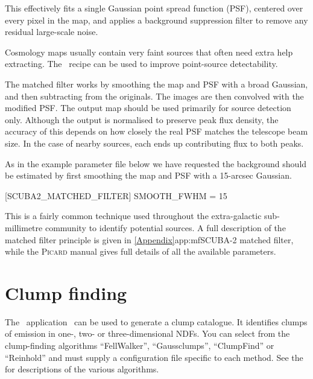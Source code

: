 This effectively fits a single Gaussian point spread function (PSF),
centered over every pixel in the map, and applies a background
suppression filter to remove any residual large-scale noise.

Cosmology maps usually contain very faint sources that often need
extra help extracting. The \picard\ recipe
can be used to improve point-source detectability.

The matched filter works by smoothing the map and PSF with a broad
Gaussian, and then subtracting from the originals. The images are then
convolved with the modified PSF. The output map should be used
primarily for source detection only. Although the output is normalised
to preserve peak flux density, the accuracy of this depends on how
closely the real PSF matches the telescope beam size. In the case of
nearby sources, each ends up contributing flux to both peaks.

\begin{terminalv}
\end{terminalv}

As in the example parameter file below we have requested the
background should be estimated by first smoothing the map and PSF with
a 15-arcsec Gaussian.

\begin{terminalv}

[SCUBA2_MATCHED_FILTER]
SMOOTH_FWHM = 15

\end{terminalv}

This is a fairly common technique used throughout the extra-galactic
sub-millimetre community to identify potential sources. A full
description of the matched filter principle is given in
\cref{Appendix}{app:mf}{SCUBA-2 matched filter}, while the
\textsc{Picard} manual gives full details of all the available
parameters.

\section{Clump finding}
\label{sec:clumps}
\label{sec:clumpfind}

The \cupid\ application \findclumps\ can be used to generate a clump
catalogue. It identifies clumps of emission in one-, two- or
three-dimensional NDFs. You can select from the clump-finding
algorithms ``FellWalker''\cite{fellwalker}, ``Gaussclumps'',
``ClumpFind'' or ``Reinhold'' and must supply a configuration file
specific to each method. See the 
for descriptions of the various algorithms.


